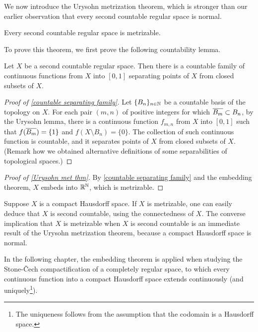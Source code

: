 We now introduce the Urysohn metrization theorem, which is stronger than our earlier observation that every second countable regular space is normal.
\begin{thm}\label{Urysohn met thm}
    Every second countable regular space is metrizable.
\end{thm}
To prove this theorem, we first prove the following countability lemma.
\begin{lem}\label{countable separating family}
    Let $X$ be a second countable regular space.
    Then there is a countable family of continuous functions from $X$ into $[0, 1]$ separating points of $X$ from closed subsets of $X$.
\end{lem}
\begin{proof}[Proof of \cref{countable separating family}]
    Let $\{B_n\}_{n\in{\mathbb{N}}}$ be a countable basis of the topology on $X$.
    For each pair $(m, n)$ of positive integers for which $\overline{B_m}\subset B_n$, by the Urysohn lemma, there is a continuous function $f_{m, n}$ from $X$ into $[0, 1]$ such that $f(\overline{B_m})=\{1\}$ and $f(X\setminus B_n)=\{0\}$.
    The collection of such continuous function is countable, and it separates points of $X$ from closed subsets of $X$. (Remark how we obtained alternative definitions of some separabilities of topological spaces.)
\end{proof}
\begin{proof}[Proof of \cref{Urysohn met thm}]
    By \cref{countable separating family} and the embedding theorem, $X$ embeds into ${\mathbb{R}}^{\mathbb{N}}$, which is metrizable.
\end{proof}

\begin{exmp}
    Suppose $X$ is a compact Hausdorff space.
    If $X$ is metrizable, one can easily deduce that $X$ is second countable, using the connectedness of $X$.
    The converse implication that $X$ is metrizable when $X$ is second countable is an immediate result of the Urysohn metrization theorem, because a compact Hausdorff space is normal.
\end{exmp}

In the following chapter, the embedding theorem is applied when studying the Stone-\v{C}ech compactification of a completely regular space, to which every continuous function into a compact Hausdorff space extends continuously (and uniquely\footnote{The uniqueness follows from the assumption that the codomain is a Hausdorff space.}).